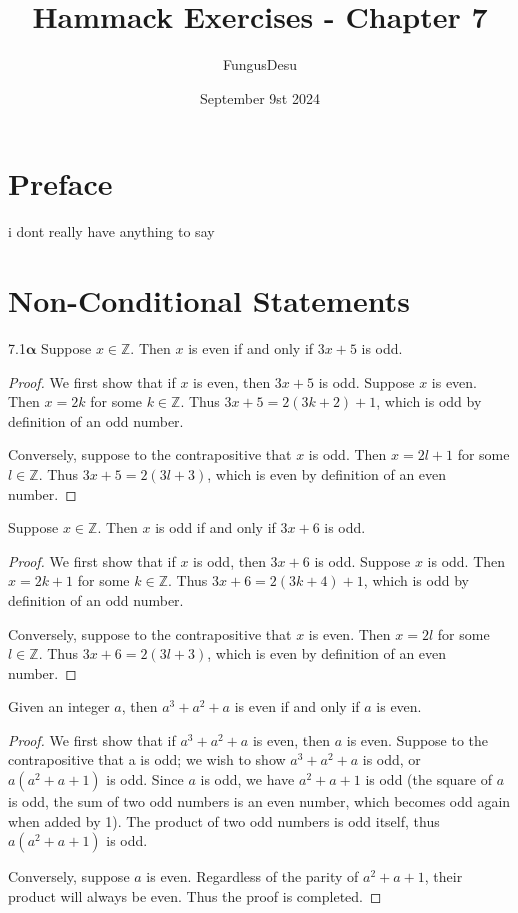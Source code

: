 \documentclass{exam}
\title{Hammack Exercises - Chapter 7}
\author{FungusDesu}
\date{September 9st 2024}
\begin{document}
\maketitle

\section{Preface}
i dont really have anything to say

\section{Non-Conditional Statements}

\begin{proposition}{7.1$\mathbf{\alpha}$}
    Suppose $x\in\mathbb Z$. Then $x$ is even if and only if $3x + 5$ is odd.
\end{proposition}

\begin{proof}
    We first show that if $x$ is even, then $3x + 5$ is odd. Suppose $x$ is even. Then $x = 2k$ for some $k\in\mathbb Z$. Thus $3x + 5 = 2(3k + 2) + 1$, which is odd by definition of an odd number.

    Conversely, suppose to the contrapositive that $x$ is odd. Then $x = 2l + 1$ for some $l\in\mathbb Z$. Thus $3x +5 = 2(3l + 3)$, which is even by definition of an even number.
\end{proof}

\begin{proposition}{7.2}
    Suppose $x\in\mathbb Z$. Then $x$ is odd if and only if $3x + 6$ is odd.
\end{proposition}

\begin{proof}
    We first show that if $x$ is odd, then $3x + 6$ is odd. Suppose $x$ is odd. Then $x = 2k+1$ for some $k\in\mathbb Z$. Thus $3x + 6 = 2(3k + 4)+1$, which is odd by definition of an odd number.

    Conversely, suppose to the contrapositive that $x$ is even. Then $x = 2l$ for some $l\in\mathbb Z$. Thus $3x + 6 = 2(3l + 3)$, which is even by definition of an even number.
\end{proof}

\begin{proposition}{7.3}
    Given an integer $a$, then $a^3+a^2+a$ is even if and only if $a$ is even.
\end{proposition}

\begin{proof}
    We first show that if $a^3 + a^2 + a$ is even, then $a$ is even. Suppose to the contrapositive that a is odd; we wish to show $a^3+a^2+a$ is odd, or $a(a^2 + a + 1)$ is odd. Since $a$ is odd, we have $a^2 + a +1$ is odd (the square of $a$ is odd, the sum of two odd numbers is an even number, which becomes odd again when added by 1). The product of two odd numbers is odd itself, thus $a(a^2+a+1)$ is odd.

    Conversely, suppose $a$ is even. Regardless of the parity of $a^2 + a + 1$, their product will always be even. Thus the proof is completed.
\end{proof}
\end{document}
